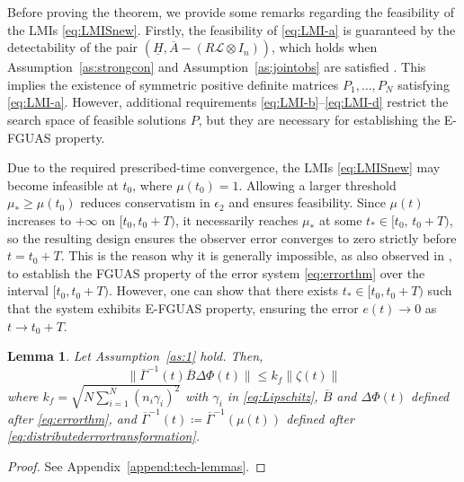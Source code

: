 \documentclass[journal]{IEEEtran}
\newtheorem{lemma}{Lemma}
\begin{document}
Before proving the theorem, we provide some remarks regarding the feasibility of the LMIs \eqref{eq:LMISnew}.
Firstly, the feasibility of \eqref{eq:LMI-a} is guaranteed by the detectability of the pair $(\underline H, \overline A-(R\mathcal L\otimes I_n))$, which holds when Assumption~\ref{as:strongcon} and Assumption~\ref{as:jointobs} are satisfied \cite{ugrinovskii2013}. 
This implies the existence of symmetric positive definite matrices $P_1,\dots,P_N$ satisfying \eqref{eq:LMI-a}. However, additional requirements \eqref{eq:LMI-b}--\eqref{eq:LMI-d} restrict the search space of feasible solutions $P$, but they are necessary for establishing the E-FGUAS property.

Due to the required prescribed-time convergence, the LMIs \eqref{eq:LMISnew} may become infeasible at $t_0$, where $\mu(t_0)=1$. Allowing a larger threshold $\mu_\ast \ge \mu(t_0)$ reduces conservatism in $\epsilon_2$ and ensures feasibility. Since $\mu(t)$ increases to $+\infty$ on $[t_0,t_0+T)$, it necessarily reaches $\mu_\ast$ at some $t_\ast \in [t_0,\,t_0+T)$, so the resulting design ensures the observer error converges to zero strictly before $t=t_0+T$.
This is the reason why it is generally impossible, as also observed in \cite{Holloway19}, to establish the FGUAS property of the error system \eqref{eq:errorthm} over the interval $[t_0,t_0+T)$. However, one can show that there exists $t_\ast\in[t_0,t_0+T)$ such that the system exhibits E-FGUAS property, ensuring the error $e(t)\to 0$ as $t\to t_0+T$. 

\begin{lemma} \label{lem:key-ineq}
    Let Assumption~\ref{as:1} hold. Then, 
    \begin{equation} \label{eq:k_f-ineq}
        \|\overline\Gamma^{-1}(t) \overline B \Delta\Phi(t)\| \leq k_f \|\zeta(t)\|
    \end{equation}
    where $k_f \!=\! \sqrt{\!N\! \sum_{i=1}^N \!(n_i\gamma_i\!)^2}$ with $\gamma_i$ in \eqref{eq:Lipschitz},  $\overline B$ and $\Delta\Phi(t)$ defined after \eqref{eq:errorthm}, and $\overline\Gamma^{-1}\!(t)\!\coloneqq\!\overline\Gamma^{-1}\!(\mu(t))\!$ defined after \eqref{eq:distributederrortransformation}.
\end{lemma}
\begin{proof}
    See Appendix~\ref{append:tech-lemmas}.
\end{proof}
\end{document}
